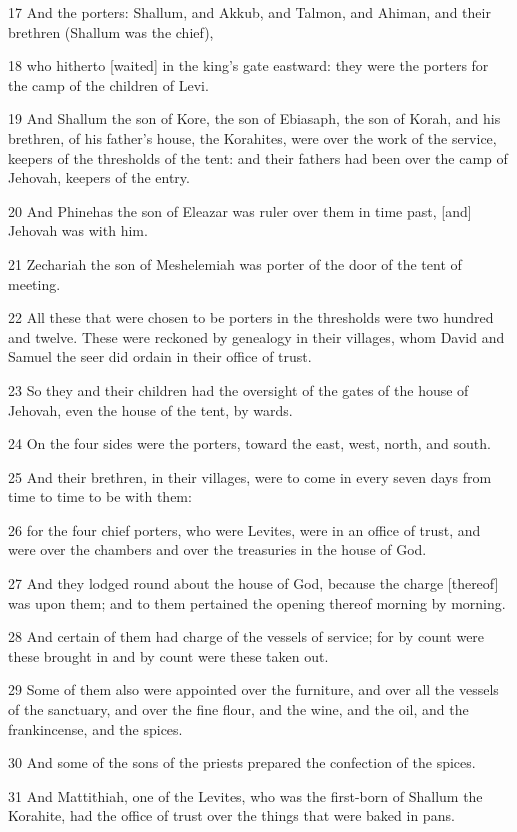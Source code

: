 \par 17 And the porters: Shallum, and Akkub, and Talmon, and Ahiman, and their brethren (Shallum was the chief),
\par 18 who hitherto [waited] in the king's gate eastward: they were the porters for the camp of the children of Levi.
\par 19 And Shallum the son of Kore, the son of Ebiasaph, the son of Korah, and his brethren, of his father's house, the Korahites, were over the work of the service, keepers of the thresholds of the tent: and their fathers had been over the camp of Jehovah, keepers of the entry.
\par 20 And Phinehas the son of Eleazar was ruler over them in time past, [and] Jehovah was with him.
\par 21 Zechariah the son of Meshelemiah was porter of the door of the tent of meeting.
\par 22 All these that were chosen to be porters in the thresholds were two hundred and twelve. These were reckoned by genealogy in their villages, whom David and Samuel the seer did ordain in their office of trust.
\par 23 So they and their children had the oversight of the gates of the house of Jehovah, even the house of the tent, by wards.
\par 24 On the four sides were the porters, toward the east, west, north, and south.
\par 25 And their brethren, in their villages, were to come in every seven days from time to time to be with them:
\par 26 for the four chief porters, who were Levites, were in an office of trust, and were over the chambers and over the treasuries in the house of God.
\par 27 And they lodged round about the house of God, because the charge [thereof] was upon them; and to them pertained the opening thereof morning by morning.
\par 28 And certain of them had charge of the vessels of service; for by count were these brought in and by count were these taken out.
\par 29 Some of them also were appointed over the furniture, and over all the vessels of the sanctuary, and over the fine flour, and the wine, and the oil, and the frankincense, and the spices.
\par 30 And some of the sons of the priests prepared the confection of the spices.
\par 31 And Mattithiah, one of the Levites, who was the first-born of Shallum the Korahite, had the office of trust over the things that were baked in pans.
